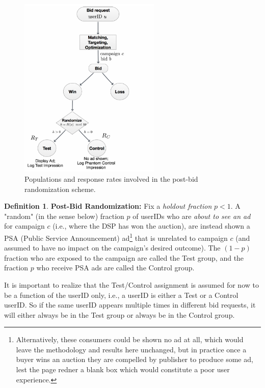 \documentclass[11pt,a4paper]{article}
\theoremstyle{definition}
\newtheorem{definition}{Definition}[section]
\theoremstyle{remark}
\theoremstyle{definition}
\theoremstyle{definition}
\theoremstyle{definition}
\theoremstyle{definition}
\theoremstyle{definition}
\theoremstyle{definition}
\begin{document}
\begin{figure}\centering
\includegraphics[width = 0.6\textwidth]{post-bid-math.pdf}
\caption{Populations and response rates involved in the post-bid randomization scheme.}
\label{fig-post-bid}
\end{figure}

\begin{definition}
{\bf Post-Bid Randomization:} Fix a {\em holdout fraction} $p < 1$. 
A "random" (in the sense below) fraction $p$ of userIDs who are {\em about to see an ad} for campaign $c$ (i.e., where the DSP has won the auction), are instead shown a PSA (Public Service Announcement) ad\footnote{Alternatively, these consumers could be shown no ad at all, which would leave the methodology and results here unchanged, but in practice once a buyer wins an auction they are compelled by publisher to produce some ad, lest the page redner a blank box which would constitute a poor user experience.} that is unrelated to campaign $c$ (and assumed to have no impact on the campaign's desired outcome). The $(1-p)$ fraction who are exposed to the campaign are called the Test group, and the fraction $p$ who receive PSA ads are called the Control group.
\end{definition}

It is important to realize that the Test/Control assignment is assumed for now to be a function of the userID only, i.e., a userID is either a Test or a Control userID. So if the same userID appears multiple times in different bid requests, it will either always be in the Test group or always be in the Control group. 
\end{document}
